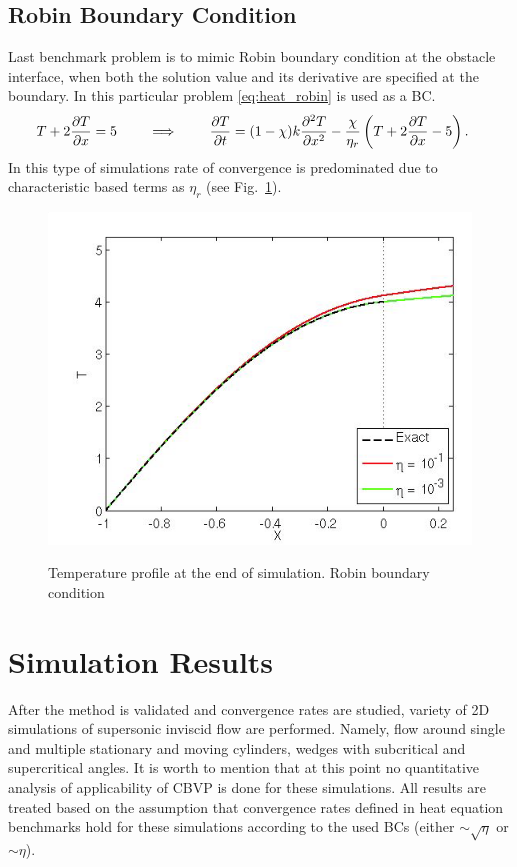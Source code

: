\subsection{Robin Boundary Condition}
Last benchmark problem is to mimic Robin boundary condition at the obstacle interface, when both the solution value and its derivative are specified at the boundary. In this particular problem \eqref{eq:heat_robin} is used as a BC.
\begin{align}
T + 2 \frac {\partial T}{\partial x} = 5 \qquad \implies \qquad \frac {\partial T}{\partial t} &= (1-\chi)k \frac {\partial^2 T}{\partial x^2} - \frac \chi {\eta_r} \left(T + 2 \frac {\partial T}{\partial x} - 5\right). \label{eq:heat_robin}
\end{align}
In this type of simulations rate of convergence is predominated due to characteristic based terms as $\eta_r$ \cite{ebd_nk_ovv_cbvp_jcp} (see Fig.~\ref{fig:heat_robin}).
\begin{figure}[h!]
\centering \includegraphics[scale=0.6]{fig/heat_robin.png}\\
\caption{Temperature profile at the end of simulation. Robin boundary condition \label{fig:heat_robin}}
\end{figure} 

\section{Simulation Results}
After the method is validated and convergence rates are studied, variety of 2D simulations of supersonic inviscid flow are performed. Namely, flow around single and multiple stationary and moving cylinders, wedges with subcritical and supercritical angles. It is worth to mention that at this point no quantitative analysis of applicability of CBVP is done for these simulations. All results are treated based on the assumption that convergence rates defined in heat equation benchmarks hold for these simulations according to the used BCs (either $\sim \sqrt \eta$ or $\sim \eta$). 

